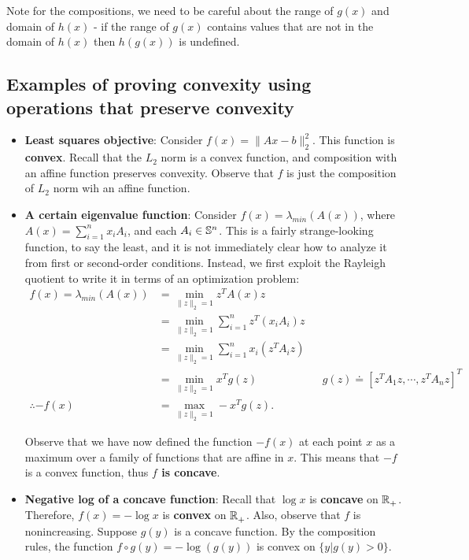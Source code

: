 \documentclass[12pt]{article}
\begin{document}
Note for the compositions, we need to be careful about the range of $g(x)$ and domain of $h(x)$ - if the range of $g(x)$ contains values that are not in the domain of $h(x)$ then $h(g(x))$ is undefined.\\

\subsection{Examples of proving convexity using operations that preserve convexity}

\begin{itemize}
\item \textbf{Least squares objective}: Consider $f(x) = \|Ax - b\|_2^2$. This function is \textbf{convex}. Recall that the $L_2$ norm is a convex function, and composition with an affine function preserves convexity. Observe that $f$ is just the composition of $L_2$ norm wih an affine function.
\item \textbf{A certain eigenvalue function}: Consider $f(x) = \lambda_{min}\left(A(x)\right)$, where $A(x) = \sum_{i=1}^n x_i A_i$, and each $A_i \in { {\mathbb S}^{n} }$. This is a fairly strange-looking function, to say the least, and it is not immediately clear how to analyze it from first or second-order conditions. Instead, we first exploit the Rayleigh quotient to write it in terms of an optimization problem:
%
\begin{align*}
f(x) = \lambda_{min}(A(x)) &= \min_{\|z\|_2=1} z^T A(x) z \\
&= \min_{\|z\|_2=1} \sum_{i=1}^n z^T (x_i A_i) z \\
&= \min_{\|z\|_2=1} \sum_{i=1}^n x_i \left( z^T  A_i z \right) \\
&= \min_{\|z\|_2=1} x^T g(z) && g(z) \doteq [z^T A_1 z, \cdots, z^T A_n z]^T\\
\therefore - f(x) &= \max_{\|z\|_2=1} - x^T g(z).
\end{align*}

Observe that we have now defined the function $-f(x)$ at each point $x$ as a maximum over a family of functions that are affine in $x$. This means that $-f$ is a convex function, thus \textbf{$f$ is concave}. 
\item \textbf{Negative log of a concave function}: Recall that $\log x$ is \textbf{concave} on ${ {\mathbb R}_{+}^{} }$. Therefore, $f(x) = -\log x$ is \textbf{convex} on ${ {\mathbb R}_{+}^{} }$. Also, observe that $f$ is nonincreasing. Suppose $g(y)$ is a concave function. By the composition rules, the function $f \circ g (y) = - \log (g(y))$ is convex on $\{y | g(y) > 0\}$. 


\end{itemize}
\end{document}
